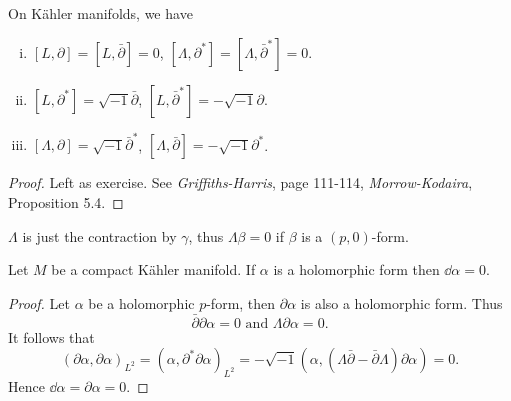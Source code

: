 \documentclass[12pt]{article}
\begin{document}
\begin{theorem}
  On K\"ahler manifolds, we have
  \begin{enumerate}[(i)]
    \item \([L,\partial]=[L,\bar{\partial}]=0\), \([\Lambda,\partial^*]=
      [\Lambda,\bar{\partial}^*]=0\).
    \item \([L,\partial^*]=\sqrt{-1}\bar{\partial}\), \([L,\bar{\partial}^*]=-\sqrt{-1}
      \partial\).
    \item \([\Lambda,\partial]=\sqrt{-1}\bar{\partial}^*\), \([\Lambda,\bar{\partial}]
      =-\sqrt{-1}\partial^*\).
  \end{enumerate}
\end{theorem}
\begin{proof}
  Left as exercise. See \emph{Griffiths-Harris}, page 111-114, \emph{Morrow-Kodaira},
  Proposition 5.4.
\end{proof}
\begin{remark}
  \(\Lambda\) is just the contraction by \(\gamma\), thus \(\Lambda\beta=0\) if
  \(\beta\) is a \((p,0)\)-form.
\end{remark}
\begin{corollary}
  Let \(M\) be a compact K\"ahler manifold. If \(\alpha\) is a holomorphic form then
  \(\dd{\alpha}=0\).
\end{corollary}
\begin{proof}
  Let \(\alpha\) be a holomorphic \(p\)-form, then \(\partial\alpha\) is also a
  holomorphic form. Thus \[
    \bar{\partial}\partial\alpha=0\text{ and }\Lambda\partial\alpha=0
  .\] It follows that \[
    (\partial\alpha,\partial\alpha)_{L^2}=(\alpha,\partial^*\partial\alpha)_{L^2}
    =-\sqrt{-1}(\alpha,(\Lambda\bar{\partial}-\bar{\partial}\Lambda)\partial\alpha)=0
  .\] Hence \(\dd{\alpha}=\partial\alpha=0\).
\end{proof}
\end{document}
